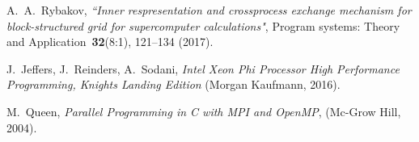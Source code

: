 \documentclass[
11pt,%
tightenlines,%
twoside,%
onecolumn,%
nofloats,%
nobibnotes,%
nofootinbib,%
superscriptaddress,%
noshowpacs,%
centertags]%
{revtex4}
\begin{document}
\begin{thebibliography}{99}
A.~A.~Rybakov, {\it ``Inner respresentation and crossprocess exchange mechanism for block-structured grid for supercomputer calculations"}, Program systems: Theory and Application~{\bf 32}(8:1), 121--134 (2017).

J.~Jeffers, J.~Reinders, A.~Sodani, \emph{Intel Xeon Phi Processor High Performance Programming, Knights Landing Edition} (Morgan Kaufmann, 2016).

M.~Queen, \emph{Parallel Programming in C with MPI and OpenMP}, (Mc-Grow Hill, 2004).

\end{thebibliography}
\end{document}
